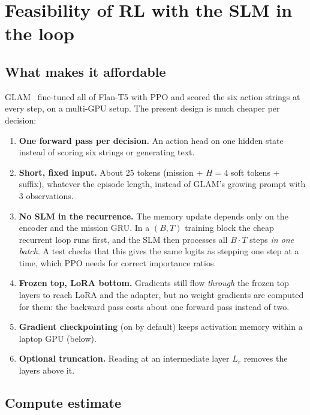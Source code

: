 \documentclass[11pt,a4paper]{article}
\begin{document}
\section{Feasibility of RL with the SLM in the loop}
\label{sec:compute}

\subsection{What makes it affordable}

GLAM~\cite{carta2023glam} fine-tuned all of Flan-T5 with PPO and scored the six action strings at every step, on a
multi-GPU setup. The present design is much cheaper per decision:
\begin{enumerate}
  \item \textbf{One forward pass per decision.} An action head on one hidden state instead of scoring six strings or generating text.
  \item \textbf{Short, fixed input.} About 25 tokens (mission + $H{=}4$ soft tokens + suffix), whatever the episode length, instead of GLAM's growing prompt with 3 observations.
  \item \textbf{No SLM in the recurrence.} The memory update depends only on the encoder and the mission GRU. In a
  $(B,T)$ training block the cheap recurrent loop runs first, and the SLM then processes all $B\cdot T$ steps \emph{in
  one batch}. A test checks that this gives the same logits as stepping one step at a time, which PPO needs for correct
  importance ratios.
  \item \textbf{Frozen top, LoRA bottom.} Gradients still flow \emph{through} the frozen top layers to reach LoRA and
  the adapter, but no weight gradients are computed for them: the backward pass costs about one forward pass instead of two.
  \item \textbf{Gradient checkpointing} (on by default) keeps activation memory within a laptop GPU (below).
  \item \textbf{Optional truncation.} Reading at an intermediate layer $L_r$ removes the layers above it.
\end{enumerate}

\subsection{Compute estimate}
\end{document}
